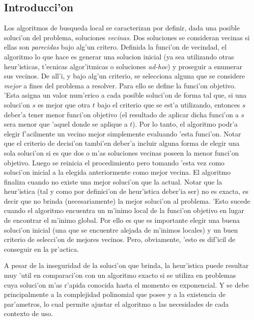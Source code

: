 \subsection{Introducci'on}
Los algoritmos de busqueda local se caracterizan por definir, dada una posible soluci'on del problema, soluciones \emph{vecinas}. Dos soluciones se consideran vecinas si ellas son \emph{parecidas} bajo alg'un critero. Definida la funci'on de vecindad, el algoritmo lo que hace es generar una solucion inicial (ya sea utilizando otras heur'isticas, t'ecnicas algor'itmicas o soluciones \emph{ad-hoc}) y proseguir a enumerar sus vecinos. De all'i, y bajo alg'un criterio, se selecciona alguna que se considere \emph{mejor} a fines del problema a resolver. Para ello se define la funci'on objetivo. 'Esta asigna un valor num'erico a cada posible soluci'on de forma tal que, si una soluci'on $s$ es mejor que otra $t$ bajo el criterio que se est'a utilizando, entonces $s$ deber'a tener menor funci'on objetivo (el resultado de aplicar dicha funci'on a $s$ sera menor que 'aquel donde se aplique a $t$). Por lo tanto, el algoritmo podr'a elegir f'acilmente un vecino mejor simplemente evaluando 'esta funci'on. Notar que el criterio de decisi'on tambi'en deber'a incluir alguna forma de elegir una sola soluci'on si es que dos o m'as soluciones vecinas poseen la menor funci'on objetivo. Luego se reinicia el procedimiento pero tomando 'esta vez como soluci'on inicial a la elegida anteriormente como mejor vecina. El algoritmo finaliza cuando no existe una mejor soluci'on que la actual. Notar que la heur'istica (tal y como por definici'on de heur'istica deber'ia ser) no es exacta, es decir que no brinda (necesariamente) la mejor soluci'on al problema. 'Esto sucede cuando el algoritmo encuentra un m'inimo local de la funci'on objetivo en lugar de encontrar el m'inimo global. Por ello es que es importante elegir una buena soluci'on inicial (una que se encuentre alejada de m'inimos locales) y un buen criterio de selecci'on de mejores vecinos. Pero, obviamente, 'esto es dif'icil de conseguir en la pr'actica.

A pesar de la inseguridad de la soluci'on que brinda, la heur'istica puede resultar muy 'util en comparaci'on con un algoritmo exacto si se utiliza en problemas cuya soluci'on m'as r'apida conocida hasta el momento es exponencial. Y se debe principalmente a la complejidad polinomial que posee y a la existencia de par'ametros, lo cual permite ajustar el algoritmo a las necesidades de cada contexto de uso.
